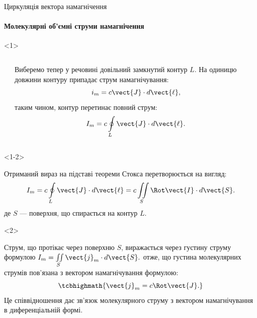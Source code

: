 \documentclass{beamer}
\begin{document}
\begin{frame}{Циркуляція вектора намагнічення}{}
	\framesubtitle<2>{Молекулярні об'ємні струми намагнічення}
	\begin{onlyenv}
		\begin{columns}
			\begin{column}{0.5\linewidth}
			\end{column}
			\begin{column}{0.5\linewidth}
				\begin{block}{}\justifying\small
					Виберемо тепер у речовині довільний замкнутий контур {\color{green!50!black}$L$}. На одиницю довжини контуру припадає струм
					намагнічування:
					\begin{equation*}
						i_m = c\vect{J}\cdot d\vect{\ell},
					\end{equation*}
					таким чином,  контур перетинає повний струм:
					\begin{equation*}
						I_m = c\oint\limits_L \vect{J}\cdot d\vect{\ell}.
					\end{equation*}
				\end{block}
			\end{column}
		\end{columns}
	\end{onlyenv}
	\begin{onlyenv}<1-2>
		\begin{block}{}\justifying
			Отриманий вираз на підставі теореми Стокса перетворюється на вигляд:
			\begin{equation*}
				I_m = c\oint\limits_L \vect{J}\cdot d\vect{\ell} = c \iint\limits_S \Rot\vect{I}\cdot d\vect{S}.
			\end{equation*}
			де $S$ --- поверхня, що спирається на контур $L$.
		\end{block}
	\end{onlyenv}
	\begin{onlyenv}
		\begin{block}{}\justifying
			Струм, що протікає через поверхню $S$, виражається через густину струму формулою
			\(
			I_m = \iint\limits_S \vect{j}_m\cdot d\vect{S}.
			\)
			отже, що густина молекулярних струмів пов'язана з вектором намагнічування
			формулою:
			\begin{equation*}
				\tcbhighmath{\vect{j}_m = c\Rot\vect{J}.}
			\end{equation*}
			Це співвідношення дає \alert{зв'язок молекулярного струму з вектором намагнічування в диференціальній формі}.
		\end{block}
	\end{onlyenv}
\end{frame}
\end{document}
